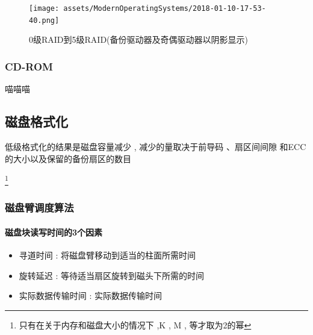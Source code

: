 \documentclass[UTF8,a4paper]{ctexart}
\begin{document}
\begin{figure}[H]
	\centering
	\texttt{[image: assets/ModernOperatingSystems/2018-01-10-17-53-40.png]}
	\caption{0级RAID到5级RAID(备份驱动器及奇偶驱动器以阴影显示)}
\end{figure}

\subsubsection{CD-ROM}
喵喵喵

\subsection{磁盘格式化}
低级格式化的结果是磁盘容量减少 , 减少的量取决于前导码 、扇区间间隙 和ECC的大小以及保留的备份扇区的数目

\footnote{\color{red}只有在关于内存和磁盘大小的情况下 ,K , M , 等才取为2的幂}


\subsubsection{磁盘臂调度算法}
\paragraph{磁盘块读写时间的3个因素}
\begin{itemize}
	\item 寻道时间 : 将磁盘臂移动到适当的柱面所需时间
	\item 旋转延迟 : 等待适当扇区旋转到磁头下所需的时间
	\item 实际数据传输时间 : 实际数据传输时间
\end{itemize}
\end{document}
